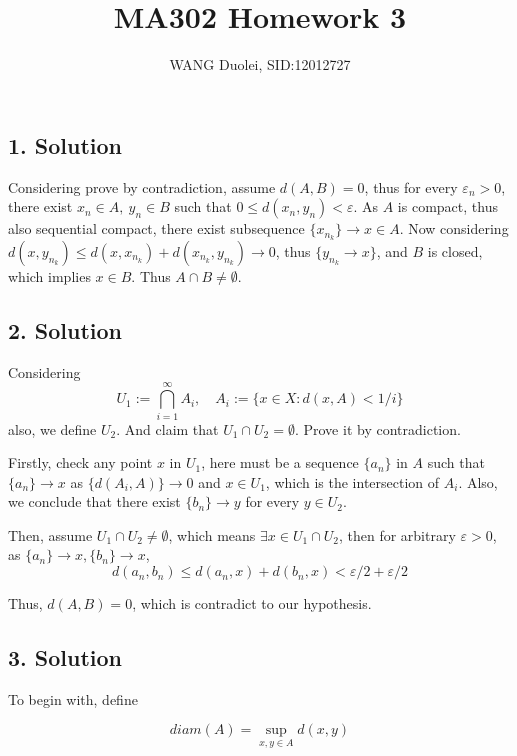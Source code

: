\documentclass{article}
\title{MA302 Homework 3}
\author{WANG Duolei, SID:12012727}
\affil{wangdl2020@mail.sustech.edu.cn}
\date{}
\begin{document}
\maketitle

\subsection*{1. Solution}
Considering prove by contradiction, assume \(d(A, B) = 0\), thus for every \(\varepsilon_n > 0\), there exist \(x_n \in A,\ y_n \in B\) such that \(0 \le d(x_n, y_n) < \varepsilon\). As \(A\) is compact, thus also sequential compact, there exist subsequence \(\{x_{n_k}\} \to x \in A\). Now considering \(d(x, y_{n_k}) \le d(x, x_{n_k}) + d(x_{n_k}, y_{n_k}) \to 0\), thus \(\{y_{n_k} \to x\}\), and \(B\) is closed, which implies \(x \in B\). Thus \(A \cap B \ne \emptyset
\).

\subsection*{2. Solution}
Considering
\[U_1 := \bigcap_{i = 1}^{\infty} A_i,\quad A_i := \{x \in X : d(x, A) < 1/i\}\]
also, we define \(U_2\). And claim that \(U_1 \cap U_2  = \emptyset\). Prove it by contradiction.

Firstly, check any point \(x\) in \(U_1\), here must be a sequence \(\{a_n\}\) in \(A\) such that \(\{a_n\} \to x\) as \(\{d(A_i, A)\} \to 0\) and \(x \in U_1\), which is the intersection of \(A_i\). Also, we conclude that there exist \(\{b_n\} \to y\) for every \(y \in U_2\). 

Then, assume \(U_1 \cap U_2 \ne \emptyset\), which means \(\exists x \in U_1 \cap U_2\), then for arbitrary \(\varepsilon > 0\), as \(\{a_n\} \to x, \{b_n\} \to x\), 
\[d(a_n, b_n) \le d(a_n, x) + d(b_n, x) < \varepsilon/2 + \varepsilon/2\]

Thus, \(d(A, B) = 0\), which is contradict to our hypothesis.

\subsection*{3. Solution}

To begin with, define
    
\[diam(A) = \sup_{x, y \in A} d(x, y)\]
\end{document}
